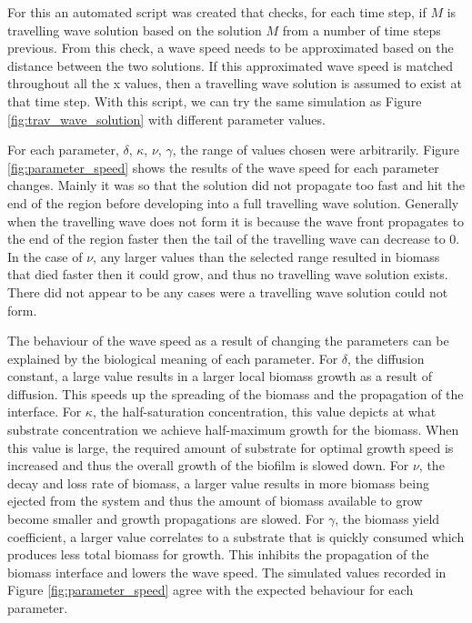 For this an automated script was created that checks, for each time step, if $M$ is travelling wave solution based on the solution $M$ from a number of time steps previous.
From this check, a wave speed needs to be approximated based on the distance between the two solutions.
If this approximated wave speed is matched throughout all the x values, then a travelling wave solution is assumed to exist at that time step.
With this script, we can try the same simulation as Figure \ref{fig:trav_wave_solution} with different parameter values.

For each parameter, $\delta$, $\kappa$, $\nu$, $\gamma$, the range of values chosen were arbitrarily.
Figure \ref{fig:parameter_speed} shows the results of the wave speed for each parameter changes.
Mainly it was so that the solution did not propagate too fast and hit the end of the region before developing into a full travelling wave solution.
Generally when the travelling wave does not form it is because the wave front propagates to the end of the region faster then the tail of the travelling wave can decrease to 0.
In the case of $\nu$, any larger values than the selected range resulted in biomass that died faster then it could grow, and thus no travelling wave solution exists.
There did not appear to be any cases were a travelling wave solution could not form.

The behaviour of the wave speed as a result of changing the parameters can be explained by the biological meaning of each parameter.
For $\delta$, the diffusion constant, a large value results in a larger local biomass growth as a result of diffusion.
This speeds up the spreading of the biomass and the propagation of the interface.
For $\kappa$, the half-saturation concentration, this value depicts at what substrate concentration we achieve half-maximum growth for the biomass.
When this value is large, the required amount of substrate for optimal growth speed is increased and thus the overall growth of the biofilm is slowed down.
For $\nu$, the decay and loss rate of biomass, a larger value results in more biomass being ejected from the system and thus the amount of biomass available to grow become smaller and growth propagations are slowed.
For $\gamma$, the biomass yield coefficient, a larger value correlates to a substrate that is quickly consumed which produces less total biomass for growth.
This inhibits the propagation of the biomass interface and lowers the wave speed.
The simulated values recorded in Figure \ref{fig:parameter_speed} agree with the expected behaviour for each parameter.



